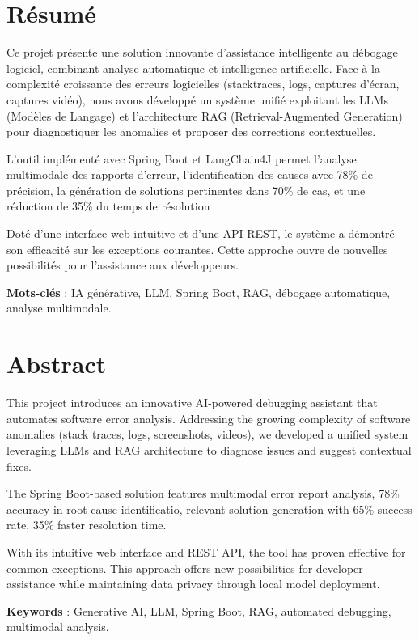 \documentclass[12pt,a4paper]{report}
\begin{document}
	
	
	\chapter*{Résumé}
	
	Ce projet présente une solution innovante d'assistance intelligente au débogage logiciel, combinant analyse automatique et intelligence artificielle. Face à la complexité croissante des erreurs logicielles (stacktraces, logs, captures d'écran, captures vidéo), nous avons développé un système unifié exploitant les LLMs (Modèles de Langage) et l'architecture RAG (Retrieval-Augmented Generation) pour diagnostiquer les anomalies et proposer des corrections contextuelles.
	
	L'outil implémenté avec Spring Boot et LangChain4J permet l'analyse multimodale des rapports d'erreur, l'identification des causes avec 78\% de précision, la génération de solutions pertinentes dans 70\% de cas, et une réduction de 35\% du temps de résolution
	
	Doté d'une interface web intuitive et d'une API REST, le système a démontré son efficacité sur les exceptions courantes. Cette approche ouvre de nouvelles possibilités pour l'assistance aux développeurs.
	
	\textbf{Mots-clés} : IA générative, LLM, Spring Boot, RAG, débogage automatique, analyse multimodale.

	\chapter*{Abstract}
	
	This project introduces an innovative AI-powered debugging assistant that automates software error analysis. Addressing the growing complexity of software anomalies (stack traces, logs, screenshots, videos), we developed a unified system leveraging LLMs and RAG architecture to diagnose issues and suggest contextual fixes.
	
	The Spring Boot-based solution features multimodal error report analysis, 78\% accuracy in root cause identificatio, relevant solution generation with 65\% success rate, 35\% faster resolution time.
	
	With its intuitive web interface and REST API, the tool has proven effective for common exceptions. This approach offers new possibilities for developer assistance while maintaining data privacy through local model deployment.
	
	\textbf{Keywords} : Generative AI, LLM, Spring Boot, RAG, automated debugging, multimodal analysis.
\end{document}
